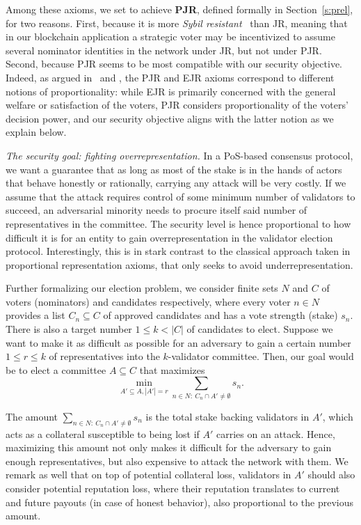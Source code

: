 Among these axioms, we set to achieve \textbf{PJR}, defined formally in Section~\ref{s:prel}, for two reasons. 
First, because it is more \emph{Sybil resistant}~\cite{douceur2002sybil} than JR, meaning that in our blockchain application a strategic voter may be incentivized to assume several nominator identities in the network under JR, but not under PJR. 
Second, because PJR seems to be most compatible with our security objective. Indeed, as argued in~\cite{peters2019proportionality} and \cite{lackner2020approval}, the PJR and EJR axioms correspond to different notions of proportionality: while EJR is primarily concerned with the general welfare or satisfaction of the voters, PJR considers proportionality of the voters' decision power, and our security objective aligns with the latter notion as we explain below.

\emph{The security goal: fighting overrepresentation.} 
In a PoS-based consensus protocol, we want a guarantee that as long as most of the stake is in the hands of actors that behave honestly or rationally, carrying any attack will be very costly. If we assume that the attack requires control of some minimum number of validators to succeed, an adversarial minority needs to procure itself said number of representatives in the committee. The security level is hence proportional to how difficult it is for an entity to gain overrepresentation in the validator election protocol. Interestingly, this is in stark contrast to the classical approach taken in proportional representation axioms, that only seeks to avoid underrepresentation. 

Further formalizing our election problem, we consider finite sets $N$ and $C$ of voters (nominators) and candidates respectively, where every voter $n\in N$ provides a list $C_n\subseteq C$ of approved candidates and has a vote strength (stake) $s_n$. There is also a target number $1\leq k< |C|$ of candidates to elect.
Suppose we want to make it as difficult as possible for an adversary to gain a certain number $1\leq r\leq k$ of representatives into the $k$-validator committee. 
Then, our goal would be to elect a committee $A\subseteq C$ that maximizes 
$$\min_{A'\subseteq A, |A'|=r} \sum_{n\in N: \ C_n\cap A'\neq \emptyset} s_n.$$ 

The amount $\sum_{n\in N: \ C_n\cap A'\neq \emptyset} s_n$ is the total stake backing validators in $A'$, which acts as a collateral susceptible to being lost if $A'$ carries on an attack. Hence, maximizing this amount not only makes it difficult for the adversary to gain enough representatives, but also expensive to attack the network with them. 
We remark as well that on top of potential collateral loss, validators in $A'$ should also consider potential reputation loss, where their reputation translates to current and future payouts (in case of honest behavior), also proportional to the previous amount. 

